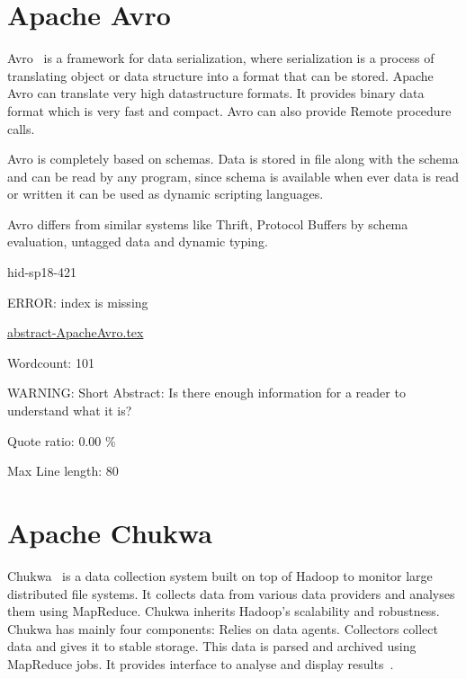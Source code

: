 \section{Apache Avro}

Avro~\cite{hid-sp18-421-AvroCloud} is a framework for data serialization, where
serialization is a process of translating object or data structure into a format
that can be stored. Apache Avro can translate very high datastructure formats.
It provides binary data format which is very fast and compact. Avro can also
provide Remote procedure calls.

Avro is completely based on schemas. Data is stored in file along with the
schema and can be read by any program, since schema is available when ever data
is read or written it can be used as dynamic scripting languages.

Avro differs from similar systems like Thrift, Protocol Buffers by schema
evaluation, untagged data and dynamic typing.



\begin{IU}

hid-sp18-421

ERROR: index is missing

\href{https://github.com/cloudmesh-community/hid-sp18-421/blob/master//technology/abstract-ApacheAvro.tex}{abstract-ApacheAvro.tex}

 

Wordcount: 101

WARNING: Short Abstract: Is there enough information for a reader to understand what it is?


Quote ratio: 0.00 \%
 
Max Line length: 80
\end{IU}

\section{Apache Chukwa}

Chukwa~\cite{hid-sp-421-ChukwaCloud} is a data collection system built on top of
Hadoop to monitor large distributed file systems. It collects data from various
data providers and analyses them using MapReduce. Chukwa inherits Hadoop's
scalability and robustness. Chukwa has mainly four components: Relies on data
agents. Collectors collect data and gives it to stable storage. This data is
parsed and archived using MapReduce jobs. It provides interface to analyse and
display results~\cite{hid-sp-421-ChukwaComponents}.




